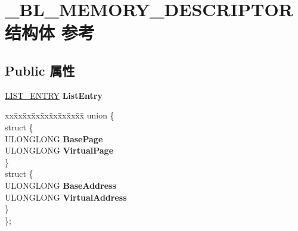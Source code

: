 \hypertarget{struct___b_l___m_e_m_o_r_y___d_e_s_c_r_i_p_t_o_r}{}\section{\+\_\+\+B\+L\+\_\+\+M\+E\+M\+O\+R\+Y\+\_\+\+D\+E\+S\+C\+R\+I\+P\+T\+O\+R结构体 参考}
\label{struct___b_l___m_e_m_o_r_y___d_e_s_c_r_i_p_t_o_r}
\subsection*{Public 属性}
\begin{DoxyCompactItemize}
\item 
\mbox{\label{struct___b_l___m_e_m_o_r_y___d_e_s_c_r_i_p_t_o_r_a98fed8601d6958412a418164c4638f0a}} 
\hyperlink{struct___l_i_s_t___e_n_t_r_y}{L\+I\+S\+T\+\_\+\+E\+N\+T\+RY} {\bfseries List\+Entry}
\item 
\mbox{\label{struct___b_l___m_e_m_o_r_y___d_e_s_c_r_i_p_t_o_r_a7e4d66f646a32b275d1dee4ee6c5fb9c}} 
\begin{tabbing}
xx\=xx\=xx\=xx\=xx\=xx\=xx\=xx\=xx\=\kill
union \{\\
\mbox{\label{union___b_l___m_e_m_o_r_y___d_e_s_c_r_i_p_t_o_r_1_1_0D105_a4b529d46b18e69b742c26c831ce1b4d8}} 
\>struct \{\\
\>\>ULONGLONG {\bfseries BasePage}\\
\>\>ULONGLONG {\bfseries VirtualPage}\\
\>\} \\
\mbox{\label{union___b_l___m_e_m_o_r_y___d_e_s_c_r_i_p_t_o_r_1_1_0D105_a95b97754ea16d01f025777720594ccfb}} 
\>struct \{\\
\>\>ULONGLONG {\bfseries BaseAddress}\\
\>\>ULONGLONG {\bfseries VirtualAddress}\\
\>\} \\
\}; \\


\end{tabbing}
\end{DoxyCompactItemize}
